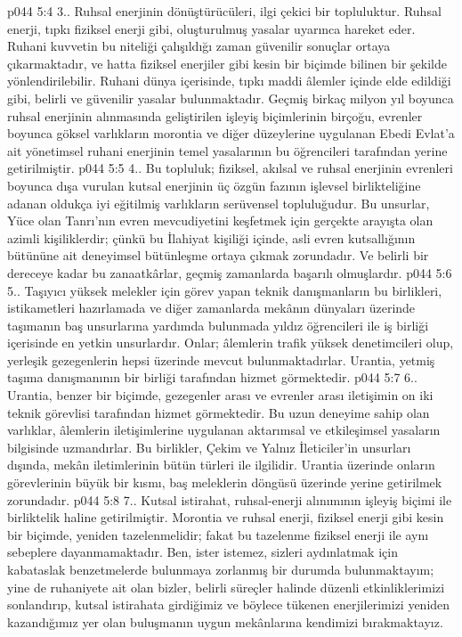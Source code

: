 \vs p044 5:4 3.\bibnobreakspace {}. Ruhsal enerjinin dönüştürücüleri, ilgi çekici bir topluluktur. Ruhsal enerji, tıpkı fiziksel enerji gibi, oluşturulmuş yasalar uyarınca hareket eder. Ruhani kuvvetin bu niteliği çalışıldığı zaman güvenilir sonuçlar ortaya çıkarmaktadır, ve hatta fiziksel enerjiler gibi kesin bir biçimde bilinen bir şekilde yönlendirilebilir. Ruhani dünya içerisinde, tıpkı maddi âlemler içinde elde edildiği gibi, belirli ve güvenilir yasalar bulunmaktadır. Geçmiş birkaç milyon yıl boyunca ruhsal enerjinin alınmasında geliştirilen işleyiş biçimlerinin birçoğu, evrenler boyunca göksel varlıkların morontia ve diğer düzeylerine uygulanan Ebedi Evlat’a ait yönetimsel ruhani enerjinin temel yasalarının bu öğrencileri tarafından yerine getirilmiştir.
\vs p044 5:5 4.\bibnobreakspace {}. Bu topluluk; fiziksel, akılsal ve ruhsal enerjinin evrenleri boyunca dışa vurulan kutsal enerjinin üç özgün fazının işlevsel birlikteliğine adanan oldukça iyi eğitilmiş varlıkların serüvensel topluluğudur. Bu unsurlar, Yüce olan Tanrı’nın evren mevcudiyetini keşfetmek için gerçekte arayışta olan azimli kişiliklerdir; çünkü bu İlahiyat kişiliği içinde, asli evren kutsallığının bütününe ait deneyimsel bütünleşme ortaya çıkmak zorundadır. Ve belirli bir dereceye kadar bu zanaatkârlar, geçmiş zamanlarda başarılı olmuşlardır.
\vs p044 5:6 5.\bibnobreakspace {}. Taşıyıcı yüksek melekler için görev yapan teknik danışmanların bu birlikleri, istikametleri hazırlamada ve diğer zamanlarda mekânın dünyaları üzerinde taşımanın baş unsurlarına yardımda bulunmada yıldız öğrencileri ile iş birliği içerisinde en yetkin unsurlardır. Onlar; âlemlerin trafik yüksek denetimcileri olup, yerleşik gezegenlerin hepsi üzerinde mevcut bulunmaktadırlar. Urantia, yetmiş taşıma danışmanının bir birliği tarafından hizmet görmektedir.
\vs p044 5:7 6.\bibnobreakspace {}. Urantia, benzer bir biçimde, gezegenler arası ve evrenler arası iletişimin on iki teknik görevlisi tarafından hizmet görmektedir. Bu uzun deneyime sahip olan varlıklar, âlemlerin iletişimlerine uygulanan aktarımsal ve etkileşimsel yasaların bilgisinde uzmandırlar. Bu birlikler, Çekim ve Yalnız İleticiler’in unsurları dışında, mekân iletimlerinin bütün türleri ile ilgilidir. Urantia üzerinde onların görevlerinin büyük bir kısmı, baş meleklerin döngüsü üzerinde yerine getirilmek zorundadır.
\vs p044 5:8 7.\bibnobreakspace {}. Kutsal istirahat, ruhsal\hyp{}enerji alınımının işleyiş biçimi ile birliktelik haline getirilmiştir. Morontia ve ruhsal enerji, fiziksel enerji gibi kesin bir biçimde, yeniden tazelenmelidir; fakat bu tazelenme fiziksel enerji ile aynı sebeplere dayanmamaktadır. Ben, ister istemez, sizleri aydınlatmak için kabataslak benzetmelerde bulunmaya zorlanmış bir durumda bulunmaktayım; yine de ruhaniyete ait olan bizler, belirli süreçler halinde düzenli etkinliklerimizi sonlandırıp, kutsal istirahata girdiğimiz ve böylece tükenen enerjilerimizi yeniden kazandığımız yer olan buluşmanın uygun mekânlarına kendimizi bırakmaktayız.
